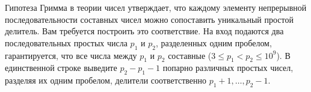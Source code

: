 Гипотеза Гримма в теории чисел утверждает, что
каждому элементу непрерывной последовательности составных чисел
можно сопоставить уникальный простой делитель. Вам требуется
построить это соответствие.
\InputFile
На вход подаются два последовательных простых числа $p_1$ и $p_2$,
разделенных одним пробелом, гарантируется, что все числа между $p_1$
и $p_2$ составные ($3 \le p_1 < p_2 \le 10^9$).
\OutputFile
В единственной строке выведите $p_2 - p_1 - 1$ попарно различных
простых чисел, разделяя их одним пробелом, делители соответственно
$p_1 + 1, \ldots, p_2 - 1$.
